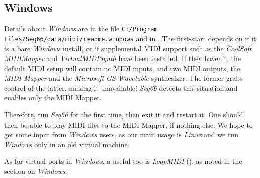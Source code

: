 \subsection{Windows}
\label{subsec:introduction_windows}


   Details about \textsl{Windows} are in the file
   \texttt{C:/Program Files/Seq66/data/midi/readme.windows}
   and in .
   The first-start depends on if it is a bare \textsl{Windows}
   install, or if supplemental MIDI support such as 
   the 
   \textsl{CoolSoft MIDIMapper} and 
   \textsl{VirtualMIDISynth} have been installed.
   If they haven't, the default MIDI setup will contain no MIDI inputs,
   and two MIDI outputs, the \textsl{MIDI Mapper} and the
   \textsl{Microsoft GS Wavetable} synthesizer.
   The former grabs control of the latter, making it unavailable!
   \textsl{Seq66} detects this situation and enables only the MIDI Mapper.

   Therefore, run \textsl{Seq66} for the first time, then exit it and
   restart it. One should then be able to play MIDI files to the MIDI Mapper,
   if nothing else.
   We hope to get some input from
   \textsl{Windows} users, as our main usage is \textsl{Linux}
   and we run \textsl{Windows} only in an old virtual machine.

   As for virtual ports in \textsl{Windows}, a useful too
   is \textsl{LoopMIDI} (\cite{loopmidi}), as noted in the section
   on \textsl{Windows}.

